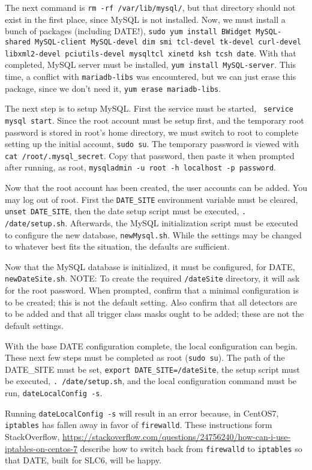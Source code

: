 \documentclass[12pt]{article}
\begin{document}
\qq The next command is {\tt rm -rf /var/lib/mysql/}, but that directory should
not exist in the first place, since MySQL is not installed. Now, we must install
a bunch of packages (including DATE!), {\tt sudo yum install BWidget
  MySQL-shared MySQL-client MySQL-devel dim smi tcl-devel tk-devel curl-devel
  libxml2-devel pciutils-devel mysqltcl xinetd ksh tcsh date}. With that
completed, MySQL server must be installed, {\tt yum install
  MySQL-server}. This time, a conflict with {\tt mariadb-libs} was encountered,
but we can just erase this package, since we don't need it, {\tt yum erase
  mariadb-libs}. 

\qq The next step is to setup MySQL. First the service must be started, {\tt
  service mysql start}. Since the root account must be setup first, and the
temporary root password is stored in root's home directory, we must switch to
root to complete setting up the initial account, {\tt sudo su}. The temporary
password is viewed with {\tt cat /root/.mysql\_secret}. Copy that password, then
paste it when prompted after running, as root, {\tt mysqladmin -u root -h
  localhost -p password}. 

\qq Now that the root account has been created, the user accounts can be
added. You may log out of root. First the {\tt DATE\_SITE} environment variable
must be cleared, {\tt unset DATE\_SITE}, then the date setup script must be
executed, {\tt . /date/setup.sh}. Afterwards, the MySQL initialization script
must be executed to configure the new database, {\tt newMysql.sh}. While the
settings may be changed to whatever best fits the situation, the defaults are
sufficient.

\qq Now that the MySQL database is initialized, it must be configured, for DATE,
{\tt newDateSite.sh}. NOTE: To create the required {\tt /dateSite} directory, it
will ask for the root password. When prompted, confirm that a minimal
configuration is to be created; this is not the default setting. Also confirm
that all detectors are to be added and that all trigger class masks ought to be
added; these are not the default settings.

\qq With the base DATE configuration complete, the local configuration can
begin. These next few steps must be completed as root ({\tt sudo su}). The path
of the DATE\_SITE must be set, {\tt export DATE\_SITE=/dateSite}, the setup script
must be executed, {\tt . /date/setup.sh}, and the local configuration command
must be run, {\tt dateLocalConfig -s}.

\qq Running {\tt dateLocalConfig -s} will result in an error because, in
CentOS7, {\tt iptables} has fallen away in favor of {\tt firewalld}. These
instructions form StackOverflow,
\url{https://stackoverflow.com/questions/24756240/how-can-i-use-iptables-on-centos-7}
describe how to switch back from {\tt firewalld} to {\tt iptables} so that DATE,
built for SLC6, will be happy.
\end{document}
